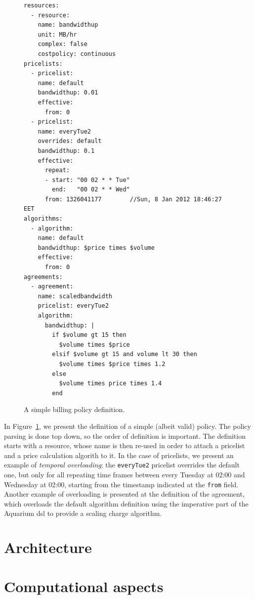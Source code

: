 \documentclass[preprint,10pt]{sigplanconf}
\begin{document}
\begin{figure}
\lstset{language=c, basicstyle=\footnotesize,
stringstyle=\ttfamily, 
flexiblecolumns=true, aboveskip=-0.9em, belowskip=0em, lineskip=0em}

\begin{lstlisting}
resources:
  - resource:
    name: bandwidthup
    unit: MB/hr
    complex: false
    costpolicy: continuous
pricelists:
  - pricelist: 
    name: default
    bandwidthup: 0.01
    effective:
      from: 0
  - pricelist: 
    name: everyTue2
    overrides: default
    bandwidthup: 0.1
    effective:
      repeat:
      - start: "00 02 * * Tue"
        end:   "00 02 * * Wed"
      from: 1326041177        //Sun, 8 Jan 2012 18:46:27 EET
algorithms:
  - algorithm:
    name: default
    bandwidthup: $price times $volume
    effective:
      from: 0
agreements:
  - agreement:
    name: scaledbandwidth
    pricelist: everyTue2
    algorithm:
      bandwidthup: |
        if $volume gt 15 then
          $volume times $price
        elsif $volume gt 15 and volume lt 30 then
          $volume times $price times 1.2
        else
          $volume times price times 1.4
        end
\end{lstlisting}

\caption{A simple billing policy definition.} 
\label{fig:dsl}
\end{figure}

In Figure~\ref{fig:dsl}, we present the definition of a simple (albeit valid) 
policy. The policy parsing is done top down, so the order of definition 
is important. The definition starts with a resource, whose name is then
re-used in order to attach a pricelist and a price calculation algorith to it.
In the case of pricelists, we present an example of \emph{temporal overloading};
the \texttt{everyTue2} pricelist overrides the default one, but only for 
all repeating time frames between every Tuesday at 02:00 and Wednesday at
02:00, starting from the timestamp indicated at the \texttt{from} field. Another
example of overloading is presented at the definition of the agreement, which
overloads the default algorithm definition using the imperative part of the
Aquarium {\sc dsl} to provide a scaling charge algorithm.

\section{Architecture}


\section{Computational aspects}
\end{document}
